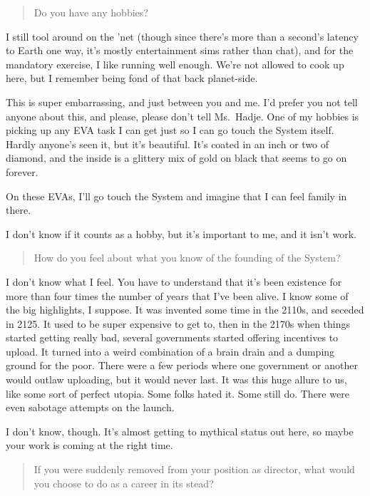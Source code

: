 \begin{quote}
Do you have any hobbies?
\end{quote}

I still tool around on the 'net (though since there's more than a second's latency to Earth one way, it's mostly entertainment sims rather than chat), and for the mandatory exercise, I like running well enough. We're not allowed to cook up here, but I remember being fond of that back planet-side.

This is super embarrassing, and just between you and me. I'd prefer you not tell anyone about this, and please, please don't tell Ms.~Hadje. One of my hobbies is picking up any EVA task I can get just so I can go touch the System itself. Hardly anyone's seen it, but it's beautiful. It's coated in an inch or two of diamond, and the inside is a glittery mix of gold on black that seems to go on forever.

On these EVAs, I'll go touch the System and imagine that I can feel family in there.

I don't know if it counts as a hobby, but it's important to me, and it isn't work.

\begin{quote}
How do you feel about what you know of the founding of the System?
\end{quote}

I don't know what I feel. You have to understand that it's been existence for more than four times the number of years that I've been alive. I know some of the big highlights, I suppose. It was invented some time in the 2110s, and seceded in 2125. It used to be super expensive to get to, then in the 2170s when things started getting really bad, several governments started offering incentives to upload. It turned into a weird combination of a brain drain and a dumping ground for the poor. There were a few periods where one government or another would outlaw uploading, but it would never last. It was this huge allure to us, like some sort of perfect utopia. Some folks hated it. Some still do. There were even sabotage attempts on the launch.

I don't know, though. It's almost getting to mythical status out here, so maybe your work is coming at the right time.

\begin{quote}
If you were suddenly removed from your position as director, what would you choose to do as a career in its stead?
\end{quote}

